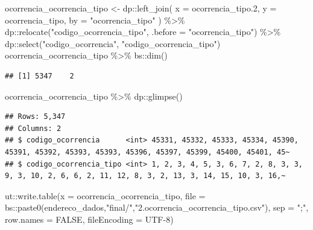 \documentclass[
]{article}
\newenvironment{Shaded}{\begin{snugshade}}{\end{snugshade}}
\newcommand{\AttributeTok}[1]{\textcolor[rgb]{0.77,0.63,0.00}{#1}}
\newcommand{\ConstantTok}[1]{\textcolor[rgb]{0.00,0.00,0.00}{#1}}
\newcommand{\FloatTok}[1]{\textcolor[rgb]{0.00,0.00,0.81}{#1}}
\newcommand{\FunctionTok}[1]{\textcolor[rgb]{0.00,0.00,0.00}{#1}}
\newcommand{\NormalTok}[1]{#1}
\newcommand{\OtherTok}[1]{\textcolor[rgb]{0.56,0.35,0.01}{#1}}
\newcommand{\SpecialCharTok}[1]{\textcolor[rgb]{0.00,0.00,0.00}{#1}}
\newcommand{\StringTok}[1]{\textcolor[rgb]{0.31,0.60,0.02}{#1}}
\begin{document}
\begin{Shaded}
\begin{Highlighting}[]
\NormalTok{ocorrencia\_ocorrencia\_tipo }\OtherTok{\textless{}{-}}\NormalTok{ dp}\SpecialCharTok{::}\FunctionTok{left\_join}\NormalTok{(}
    \AttributeTok{x =}\NormalTok{ ocorrencia\_tipo}\FloatTok{.2}\NormalTok{,}
    \AttributeTok{y =}\NormalTok{ ocorrencia\_tipo,}
    \AttributeTok{by =} \StringTok{"ocorrencia\_tipo"}
\NormalTok{) }\SpecialCharTok{\%\textgreater{}\%}
\NormalTok{    dp}\SpecialCharTok{::}\FunctionTok{relocate}\NormalTok{(}\StringTok{"codigo\_ocorrencia\_tipo"}\NormalTok{, }\AttributeTok{.before =} \StringTok{"ocorrencia\_tipo"}\NormalTok{) }\SpecialCharTok{\%\textgreater{}\%}
\NormalTok{    dp}\SpecialCharTok{::}\FunctionTok{select}\NormalTok{(}\StringTok{"codigo\_ocorrencia"}\NormalTok{, }\StringTok{"codigo\_ocorrencia\_tipo"}\NormalTok{)}
\NormalTok{ocorrencia\_ocorrencia\_tipo }\SpecialCharTok{\%\textgreater{}\%}\NormalTok{ bs}\SpecialCharTok{::}\FunctionTok{dim}\NormalTok{()}
\end{Highlighting}
\end{Shaded}

\begin{verbatim}
## [1] 5347    2
\end{verbatim}

\begin{Shaded}
\begin{Highlighting}[]
\NormalTok{ocorrencia\_ocorrencia\_tipo }\SpecialCharTok{\%\textgreater{}\%}\NormalTok{ dp}\SpecialCharTok{::}\FunctionTok{glimpse}\NormalTok{()}
\end{Highlighting}
\end{Shaded}

\begin{verbatim}
## Rows: 5,347
## Columns: 2
## $ codigo_ocorrencia      <int> 45331, 45332, 45333, 45334, 45390, 45391, 45392, 45393, 45393, 45396, 45397, 45399, 45400, 45401, 45~
## $ codigo_ocorrencia_tipo <int> 1, 2, 3, 4, 5, 3, 6, 7, 2, 8, 3, 3, 9, 3, 10, 2, 6, 6, 2, 11, 12, 8, 3, 2, 13, 3, 14, 15, 10, 3, 16,~
\end{verbatim}

\begin{Shaded}
\begin{Highlighting}[]
\NormalTok{ut}\SpecialCharTok{::}\FunctionTok{write.table}\NormalTok{(}\AttributeTok{x =}\NormalTok{ ocorrencia\_ocorrencia\_tipo,}
            \AttributeTok{file =}\NormalTok{ bs}\SpecialCharTok{::}\FunctionTok{paste0}\NormalTok{(endereco\_dados,}\StringTok{"final/"}\NormalTok{,}\StringTok{"2.ocorrencia\_ocorrencia\_tipo.csv"}\NormalTok{),}
            \AttributeTok{sep =} \StringTok{";"}\NormalTok{,}
            \AttributeTok{row.names =} \ConstantTok{FALSE}\NormalTok{,}
            \AttributeTok{fileEncoding =} \StringTok{\textquotesingle{}UTF{-}8\textquotesingle{}}\NormalTok{)}
\end{Highlighting}
\end{Shaded}
\end{document}
